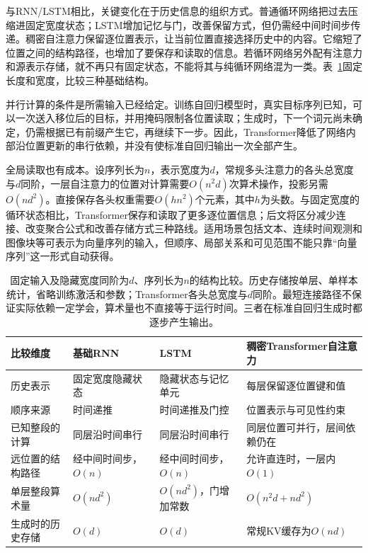 与RNN/LSTM相比，关键变化在于历史信息的组织方式。普通循环网络把过去压缩进固定宽度状态；LSTM增加记忆与门，改善保留方式，但仍需经中间时间步传递。稠密自注意力保留逐位置表示，让当前位置直接选择历史中的内容。它缩短了位置之间的结构路径，也增加了要保存和读取的信息。若循环网络另外配有注意力和源表示存储，就不再只有固定状态，不能将其与纯循环网络混为一类。表~\ref{tab:transformer-rnn-comparison}固定长度和宽度，比较三种基础结构。

并行计算的条件是所需输入已经给定。训练自回归模型时，真实目标序列已知，可以一次送入移位后的目标，并用掩码限制各位置读取；生成时，下一个词元尚未确定，仍需根据已有前缀产生它，再继续下一步。因此，Transformer降低了网络内部沿位置更新的串行依赖，并没有使标准自回归输出一次全部产生。

全局读取也有成本。设序列长为$n$，表示宽度为$d$，常规多头注意力的各头总宽度与$d$同阶，一层自注意力的位置对计算需要$O(n^2d)$次算术操作，投影另需$O(nd^2)$。直接保存各头权重需要$O(hn^2)$个元素，其中$h$为头数。与固定宽度的循环状态相比，Transformer保存和读取了更多逐位置信息；后文将区分减少连接、改变聚合公式和改善存储方式三种路线。适用场景包括文本、连续时间观测和图像块等可表示为向量序列的输入，但顺序、局部关系和可见范围不能只靠“向量序列”这一形式自动获得。

\begin{table}[htbp]
  \centering
  \small
  \begin{tabular}{@{}p{28mm}p{39mm}p{40mm}p{48mm}@{}}
    \toprule
    比较维度 & 基础RNN & LSTM & 稠密Transformer自注意力 \\
    \midrule
    历史表示 & 固定宽度隐藏状态 & 隐藏状态与记忆单元 & 每层保留逐位置键和值 \\
    顺序来源 & 时间递推 & 时间递推及门控 & 位置表示与可见性约束 \\
    已知整段的计算 & 同层沿时间串行 & 同层沿时间串行 & 同层位置可并行，层间依赖仍在 \\
    远位置的结构路径 & 经中间时间步，$O(n)$ & 经中间时间步，$O(n)$ & 允许直连时，一层内$O(1)$ \\
    单层整段算术量 & $O(nd^2)$ & $O(nd^2)$，门增加常数 & $O(n^2d+nd^2)$ \\
    生成时的历史存储 & $O(d)$ & $O(d)$ & 常规KV缓存为$O(nd)$ \\
    \bottomrule
  \end{tabular}
  \caption{固定输入及隐藏宽度同阶为$d$、序列长为$n$的结构比较。历史存储按单层、单样本统计，省略训练激活和参数；Transformer各头总宽度与$d$同阶。最短连接路径不保证实际依赖一定学会，算术量也不直接等于运行时间。三者在标准自回归生成时都逐步产生输出。}
  \label{tab:transformer-rnn-comparison}
\end{table}
\FloatBarrier


